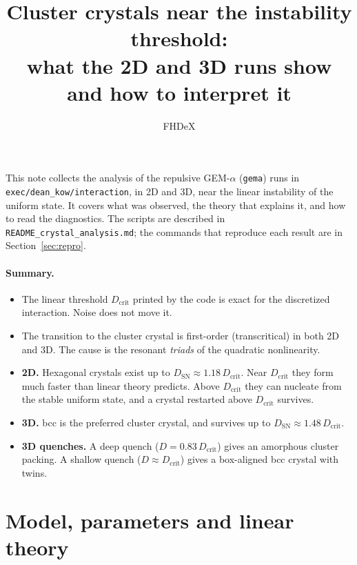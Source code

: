 \documentclass[11pt]{article}
\title{Cluster crystals near the instability threshold:\\
what the 2D and 3D \code{gema} runs show and how to interpret it}
\author{FHDeX}
\date{}
\newcommand{\code}[1]{\texttt{#1}}
\newcommand{\Dc}{D_{\mathrm{crit}}}
\newcommand{\Dsn}{D_{\mathrm{SN}}}
\begin{document}
\maketitle

\noindent This note collects the analysis of the repulsive GEM-$\alpha$
(\code{gema}) runs in \code{exec/dean\_kow/interaction}, in 2D and 3D, near the
linear instability of the uniform state. It covers what was observed, the
theory that explains it, and how to read the diagnostics. The scripts are
described in \code{README\_crystal\_analysis.md}; the commands that reproduce
each result are in Section~\ref{sec:repro}.

\paragraph{Summary.}
\begin{itemize}[nosep]
  \item The linear threshold $\Dc$ printed by the code is exact for the
        discretized interaction. Noise does not move it.
  \item The transition to the cluster crystal is first-order (transcritical) in
        both 2D and 3D. The cause is the resonant \emph{triads} of the quadratic
        nonlinearity.
  \item \textbf{2D.} Hexagonal crystals exist up to $\Dsn\approx1.18\,\Dc$.
        Near $\Dc$ they form much faster than linear theory predicts. Above
        $\Dc$ they can nucleate from the stable uniform state, and a
        crystal restarted above $\Dc$ survives.
  \item \textbf{3D.} bcc is the preferred cluster crystal, and survives up to
        $\Dsn\approx1.48\,\Dc$.
  \item \textbf{3D quenches.} A deep quench ($D=0.83\,\Dc$) gives an
        amorphous cluster packing. A shallow quench ($D\approx\Dc$) gives a
        box-aligned bcc crystal with twins.
\end{itemize}

\section{Model, parameters and linear theory}
\end{document}
